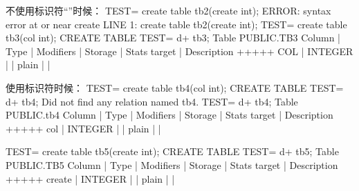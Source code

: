 \documentclass[a4,10pt,oneside,english]{sphinxmanual}
\begin{document}
\begin{sphinxVerbatim}[commandchars=\\\{\}]
不使用标识符“”时候：
TEST=\PYGZsh{} create table tb2(create int);
ERROR:  syntax error at or near \PYGZdq{}create\PYGZdq{}
LINE 1: create table tb2(create int);
                         \PYGZca{}
TEST=\PYGZsh{} create table tb3(col int);
CREATE TABLE
TEST=\PYGZsh{} \PYGZbs{}d+ tb3;
                         Table \PYGZdq{}PUBLIC.TB3\PYGZdq{}
 Column |  Type   | Modifiers | Storage | Stats target | Description
\PYGZhy{}\PYGZhy{}\PYGZhy{}\PYGZhy{}\PYGZhy{}\PYGZhy{}\PYGZhy{}\PYGZhy{}+\PYGZhy{}\PYGZhy{}\PYGZhy{}\PYGZhy{}\PYGZhy{}\PYGZhy{}\PYGZhy{}\PYGZhy{}\PYGZhy{}+\PYGZhy{}\PYGZhy{}\PYGZhy{}\PYGZhy{}\PYGZhy{}\PYGZhy{}\PYGZhy{}\PYGZhy{}\PYGZhy{}\PYGZhy{}\PYGZhy{}+\PYGZhy{}\PYGZhy{}\PYGZhy{}\PYGZhy{}\PYGZhy{}\PYGZhy{}\PYGZhy{}\PYGZhy{}\PYGZhy{}+\PYGZhy{}\PYGZhy{}\PYGZhy{}\PYGZhy{}\PYGZhy{}\PYGZhy{}\PYGZhy{}\PYGZhy{}\PYGZhy{}\PYGZhy{}\PYGZhy{}\PYGZhy{}\PYGZhy{}\PYGZhy{}+\PYGZhy{}\PYGZhy{}\PYGZhy{}\PYGZhy{}\PYGZhy{}\PYGZhy{}\PYGZhy{}\PYGZhy{}\PYGZhy{}\PYGZhy{}\PYGZhy{}\PYGZhy{}\PYGZhy{}
 COL    | INTEGER |           | plain   |              |

使用标识符时候：
TEST=\PYGZsh{} create table \PYGZdq{}tb4\PYGZdq{}(\PYGZdq{}col\PYGZdq{} int);
CREATE TABLE
TEST=\PYGZsh{} \PYGZbs{}d+ tb4;
Did not find any relation named \PYGZdq{}tb4\PYGZdq{}.
TEST=\PYGZsh{} \PYGZbs{}d+ \PYGZdq{}tb4\PYGZdq{};
                         Table \PYGZdq{}PUBLIC.tb4\PYGZdq{}
 Column |  Type   | Modifiers | Storage | Stats target | Description
\PYGZhy{}\PYGZhy{}\PYGZhy{}\PYGZhy{}\PYGZhy{}\PYGZhy{}\PYGZhy{}\PYGZhy{}+\PYGZhy{}\PYGZhy{}\PYGZhy{}\PYGZhy{}\PYGZhy{}\PYGZhy{}\PYGZhy{}\PYGZhy{}\PYGZhy{}+\PYGZhy{}\PYGZhy{}\PYGZhy{}\PYGZhy{}\PYGZhy{}\PYGZhy{}\PYGZhy{}\PYGZhy{}\PYGZhy{}\PYGZhy{}\PYGZhy{}+\PYGZhy{}\PYGZhy{}\PYGZhy{}\PYGZhy{}\PYGZhy{}\PYGZhy{}\PYGZhy{}\PYGZhy{}\PYGZhy{}+\PYGZhy{}\PYGZhy{}\PYGZhy{}\PYGZhy{}\PYGZhy{}\PYGZhy{}\PYGZhy{}\PYGZhy{}\PYGZhy{}\PYGZhy{}\PYGZhy{}\PYGZhy{}\PYGZhy{}\PYGZhy{}+\PYGZhy{}\PYGZhy{}\PYGZhy{}\PYGZhy{}\PYGZhy{}\PYGZhy{}\PYGZhy{}\PYGZhy{}\PYGZhy{}\PYGZhy{}\PYGZhy{}\PYGZhy{}\PYGZhy{}
 col    | INTEGER |           | plain   |              |

TEST=\PYGZsh{} create table tb5(\PYGZdq{}create\PYGZdq{} int);
CREATE TABLE
TEST=\PYGZsh{} \PYGZbs{}d+ tb5;
                         Table \PYGZdq{}PUBLIC.TB5\PYGZdq{}
 Column |  Type   | Modifiers | Storage | Stats target | Description
\PYGZhy{}\PYGZhy{}\PYGZhy{}\PYGZhy{}\PYGZhy{}\PYGZhy{}\PYGZhy{}\PYGZhy{}+\PYGZhy{}\PYGZhy{}\PYGZhy{}\PYGZhy{}\PYGZhy{}\PYGZhy{}\PYGZhy{}\PYGZhy{}\PYGZhy{}+\PYGZhy{}\PYGZhy{}\PYGZhy{}\PYGZhy{}\PYGZhy{}\PYGZhy{}\PYGZhy{}\PYGZhy{}\PYGZhy{}\PYGZhy{}\PYGZhy{}+\PYGZhy{}\PYGZhy{}\PYGZhy{}\PYGZhy{}\PYGZhy{}\PYGZhy{}\PYGZhy{}\PYGZhy{}\PYGZhy{}+\PYGZhy{}\PYGZhy{}\PYGZhy{}\PYGZhy{}\PYGZhy{}\PYGZhy{}\PYGZhy{}\PYGZhy{}\PYGZhy{}\PYGZhy{}\PYGZhy{}\PYGZhy{}\PYGZhy{}\PYGZhy{}+\PYGZhy{}\PYGZhy{}\PYGZhy{}\PYGZhy{}\PYGZhy{}\PYGZhy{}\PYGZhy{}\PYGZhy{}\PYGZhy{}\PYGZhy{}\PYGZhy{}\PYGZhy{}\PYGZhy{}
 create | INTEGER |           | plain   |              |
\end{sphinxVerbatim}
\end{document}

